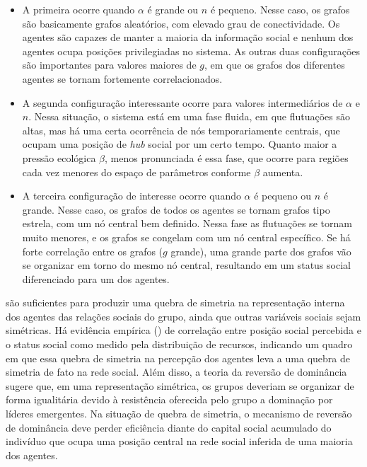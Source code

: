 \begin{itemize}
 \item A primeira ocorre quando $\alpha$ é grande ou $n$ é pequeno. Nesse caso, os grafos são basicamente grafos aleatórios, com elevado grau de conectividade. Os agentes são capazes de manter a maioria da informação social e nenhum dos agentes ocupa posições privilegiadas no sistema. As outras duas configurações são importantes para valores maiores de $g$, em que os grafos dos diferentes agentes se tornam fortemente correlacionados.
 
 \item A segunda configuração interessante ocorre para valores intermediários de $\alpha$ e $n$. Nessa situação, o sistema está em uma fase fluida, em que flutuações são altas, mas há uma certa ocorrência de nós temporariamente centrais, que ocupam uma posição de \textit{hub} social por um certo tempo. Quanto maior a pressão ecológica $\beta$, menos pronunciada é essa fase, que ocorre para regiões cada vez menores do espaço de parâmetros conforme $\beta$ aumenta.
 
 
\item  A terceira configuração de interesse ocorre quando $\alpha$ é pequeno ou $n$ é grande. Nesse caso, os grafos de todos os agentes se tornam grafos tipo estrela, com um nó central bem definido. Nessa fase as flutuações se tornam muito menores, e os grafos se congelam com um nó central específico. Se há forte correlação entre os grafos ($g$ grande), uma grande parte dos grafos vão se organizar em torno do mesmo nó central, resultando em um status social diferenciado para um dos agentes. 
\end{itemize}

 são suficientes para produzir uma quebra de simetria na representação interna dos agentes das relações sociais do grupo, ainda que outras variáveis sociais sejam simétricas. Há evidência empírica\cite{Wiessner2002} (\citet{Wiessner2002}) de correlação entre posição social percebida e o status social como medido pela distribuição de recursos, indicando um quadro em que essa quebra de simetria na percepção dos agentes leva a uma quebra de simetria de fato na rede social. Além disso, a teoria da reversão de dominância sugere que, em uma representação simétrica, os grupos deveriam se organizar de forma igualitária devido à resistência oferecida pelo grupo a dominação por líderes emergentes. Na situação de quebra de simetria, o mecanismo de reversão de dominância deve perder eficiência diante do capital social acumulado do indivíduo que ocupa uma posição central na rede social inferida de uma maioria dos agentes.


